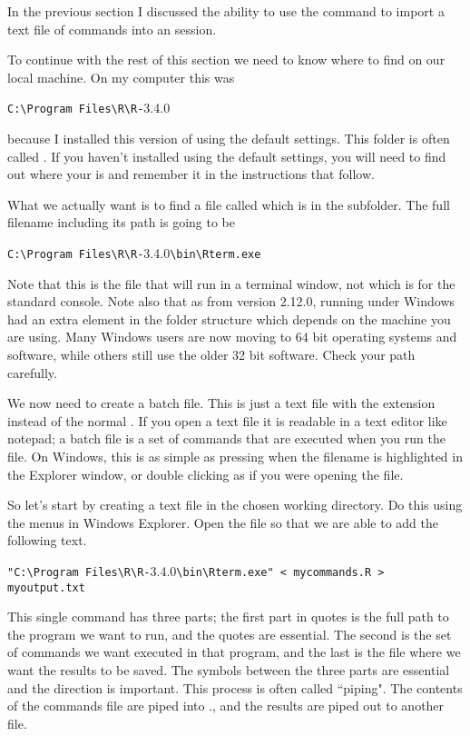 In the previous section I discussed the ability to use the  command to import a text file of commands into an \R{} session. 
 
To continue with the rest of this section we need to know where to find \R{} on our local machine. On my computer this was \begin{center} \verb+C:\Program Files\R\R-+3.4.0 
\end{center} 
 because I installed this version of \R{} using the default settings. This folder is often called \RHome{}. If you haven't installed \R{} using the default settings, you will need to find out where your \RHome{} is and remember it in the instructions that follow. 
 
What we actually want is to find a file called  which is in the  subfolder. The full filename including its path is going to be \begin{center}\verb+C:\Program Files\R\R-+3.4.0\verb+\bin\Rterm.exe+\end{center} Note that this is the file that will run \R{} in a terminal window, not  which is for the standard \R{} console. Note also that as from version 2.12.0, \R{} running under Windows had an extra element in the folder structure which depends on the machine you are using. Many Windows users are now moving to 64 bit operating systems and software, while others still use the older 32 bit software. Check your path carefully. 
 
We now need to create a batch file. This is just a text file with the extension  instead of the normal . If you open a text file it is readable in a text editor like notepad; a batch file is a set of commands that are executed when you run the file. On Windows, this is as simple as pressing  when the filename is highlighted in the Explorer window, or double clicking as if you were opening the file. 
 
So let's start by creating a text file in the chosen working directory. Do this using the menus in Windows Explorer. Open the file so that we are able to add the following text.  
\begin{center} 
\verb+"C:\Program Files\R\R-+3.4.0\verb+\bin\Rterm.exe" < mycommands.R > myoutput.txt+ 
\end{center} 
 
This single command has three parts; the first part in quotes is the full path to the program we want to run, and the quotes are essential. The second is the set of commands we want executed in that program, and the last is the file where we want the results to be saved. The symbols between the three parts are essential and the direction is important. This process is often called ``piping". The contents of the commands file are piped into \R{}., and the results are piped out to another file. 
 
